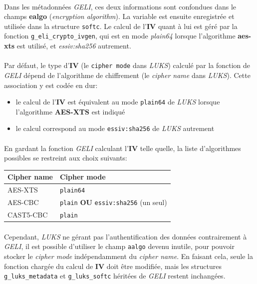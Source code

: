 \paragraph{}
Dans les métadonnées \textit{GELI}, ces deux informations sont confondues dans
le champs \textbf{ealgo} (\textit{encryption algorithm}). La variable est
ensuite enregistrée et utilisée dans la structure \texttt{softc}. Le calcul de
l'\textbf{IV} quant à lui est géré par la fonction
\texttt{g\_eli\_crypto\_ivgen}, qui est en mode \textit{plain64} lorsque
l'algorithme \textbf{aes-xts} est utilisé, et \textit{essiv:sha256} autrement.
\paragraph{}
Par défaut, le type d'\textbf{IV} (le \texttt{cipher mode} dans \textit{LUKS})
calculé par la fonction de \textit{GELI} dépend de l'algorithme de chiffrement
(le \textit{cipher name} dans \textit{LUKS}). Cette association y est codée en
dur:
\begin{itemize}
\item le calcul de l'\textbf{IV} est équivalent au mode \texttt{plain64} de
  \textit{LUKS} lorsque l'algorithme \textbf{AES-XTS} est indiqué
\item le calcul correspond au mode \texttt{essiv:sha256} de \textit{LUKS}
  autrement
\end{itemize}
\paragraph{}
En gardant la fonction \textit{GELI} calculant l'\textbf{IV} telle quelle, la
liste d'algorithmes possibles se restreint aux choix suivants:
\begin{center}
  \begin{tabular}{ | l | l | }
    \hline
    \textbf{Cipher name} & \textbf{Cipher mode} \\
    \hline
    AES-XTS              & \texttt{plain64} \\
    AES-CBC              & \texttt{plain} \textbf{OU} \texttt{essiv:sha256} (un
                           seul) \\
    CAST5-CBC            & \texttt{plain} \\
    \hline
  \end{tabular}
\end{center}
\paragraph{}
Cependant, \textit{LUKS} ne gérant pas l'authentification des données
contrairement à \textit{GELI}, il est possible d'utiliser le champ
\texttt{aalgo} devenu inutile, pour pouvoir stocker le \textit{cipher mode}
indépendamment du \textit{cipher name}. En faisant cela, seule la fonction
chargée du calcul de \textbf{IV} doit être modifiée, mais les structures
\texttt{g\_luks\_metadata} et \texttt{g\_luks\_softc} héritées de \textit{GELI}
restent inchangées.
